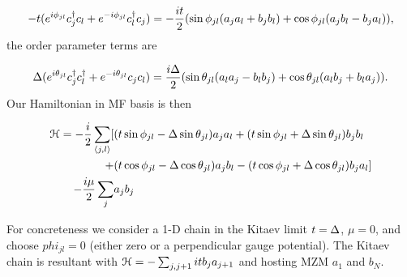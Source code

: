 \begin{equation}
  -t ( e^{i\phi_{jl}} c^{\dagger}_j c_l + e^{-i\phi_{jl}} c^{\dagger}_l c_j) = -\dfrac{it}{2} ( \sin\phi_{jl} (a_j a_l + b_j b_l) + \cos\phi_{jl} (a_j b_l - b_j a_l) ),
\end{equation}
the order parameter terms are

\begin{equation}
  \Delta ( e^{i\theta_{jl}} c^{\dagger}_j c^{\dagger}_l + e^{-i\theta_{jl}} c_j c_l) = \dfrac{i\Delta}{2} ( \sin\theta_{jl} (a_l a_j - b_l b_j) + \cos\theta_{jl} (a_l b_j + b_l a_j) ).
\end{equation}
Our Hamiltonian in MF basis is then

\begin{align}
  \mathcal{H} =  - \dfrac{i}{2} \sum_{\langle j,l\rangle} [&(t\sin\phi_{jl}-\Delta\sin\theta_{jl}) a_j a_l + (t\sin\phi_{jl}+\Delta\sin\theta_{jl}) b_j b_l \nonumber \\
  +&(t\cos\phi_{jl}-\Delta\cos\theta_{jl}) a_j b_l - (t\cos\phi_{jl}+\Delta\cos\theta_{jl}) b_j a_l] \nonumber\\
  -\dfrac{i\mu}{2} \sum_j & a_j b_j
\end{align}

For concreteness we consider a 1-D chain in the Kitaev limit $t=\Delta$, $\mu=0$, and choose $phi_{jl}=0$ (either zero or a perpendicular gauge potential).
The Kitaev chain is resultant with $\mathcal{H} = -\sum_{j,j+1} it b_j a_{j+1}$ and hosting MZM $a_1$ and $b_N$.

